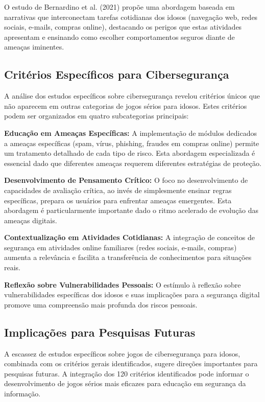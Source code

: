\begin{table}[H]
O estudo de Bernardino et al. (2021) propõe uma abordagem baseada em narrativas que interconectam tarefas cotidianas dos idosos (navegação web, redes sociais, e-mails, compras online), destacando os perigos que estas atividades apresentam e ensinando como escolher comportamentos seguros diante de ameaças iminentes.

\subsection{Critérios Específicos para Cibersegurança}
\label{subsec:criterios_ciberseguranca}

A análise dos estudos específicos sobre cibersegurança revelou critérios únicos que não aparecem em outras categorias de jogos sérios para idosos. Estes critérios podem ser organizados em quatro subcategorias principais:

\textbf{Educação em Ameaças Específicas:} A implementação de módulos dedicados a ameaças específicas (spam, vírus, phishing, fraudes em compras online) permite um tratamento detalhado de cada tipo de risco. Esta abordagem especializada é essencial dado que diferentes ameaças requerem diferentes estratégias de proteção.

\textbf{Desenvolvimento de Pensamento Crítico:} O foco no desenvolvimento de capacidades de avaliação crítica, ao invés de simplesmente ensinar regras específicas, prepara os usuários para enfrentar ameaças emergentes. Esta abordagem é particularmente importante dado o ritmo acelerado de evolução das ameaças digitais.

\textbf{Contextualização em Atividades Cotidianas:} A integração de conceitos de segurança em atividades online familiares (redes sociais, e-mails, compras) aumenta a relevância e facilita a transferência de conhecimentos para situações reais.

\textbf{Reflexão sobre Vulnerabilidades Pessoais:} O estímulo à reflexão sobre vulnerabilidades específicas dos idosos e suas implicações para a segurança digital promove uma compreensão mais profunda dos riscos pessoais.

\subsection{Implicações para Pesquisas Futuras}
\label{subsec:implicacoes_futuras}

A escassez de estudos específicos sobre jogos de cibersegurança para idosos, combinada com os critérios gerais identificados, sugere direções importantes para pesquisas futuras. A integração dos 120 critérios identificados pode informar o desenvolvimento de jogos sérios mais eficazes para educação em segurança da informação.


\end{table}
